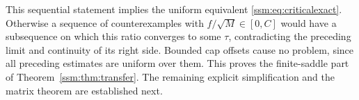 This sequential statement implies the uniform equivalent \eqref{ssm:eq:criticalexact}. Otherwise a sequence of counterexamples with $f/\sqrt M\in[0,C]$ would have a subsequence on which this ratio converges to some $\tau$, contradicting the preceding limit and continuity of its right side. Bounded cap offsets cause no problem, since all preceding estimates are uniform over them. This proves the finite-saddle part of Theorem~\ref{ssm:thm:transfer}. The remaining explicit simplification and the matrix theorem are established next.
